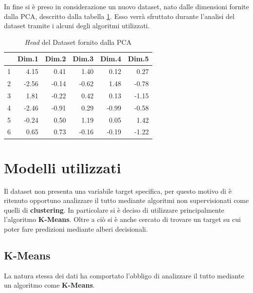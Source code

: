 \documentclass[letterpaper,11pt]{article}
\begin{document}
In fine si è preso in considerazione un nuovo dataset, nato dalle dimensioni fornite dalla PCA, descritto dalla tabella \ref{fig:PCADataset}. Esso verrà sfruttato durante l'analisi del dataset tramite i alcuni degli algoritmi utilizzati.

\begin{table}[h!t] %
\centering
\begin{tabular}{rrrrrr}
  \hline
 & Dim.1 & Dim.2 & Dim.3 & Dim.4 & Dim.5 \\ 
  \hline
1 & 4.15 & 0.41 & 1.40 & 0.12 & 0.27 \\ 
  2 & -2.56 & -0.14 & -0.62 & 1.48 & -0.78 \\ 
  3 & 1.81 & -0.22 & 0.42 & 0.13 & -1.15 \\ 
  4 & -2.46 & -0.91 & 0.29 & -0.99 & -0.58 \\ 
  5 & -0.24 & 0.50 & 1.19 & 0.05 & 1.42 \\ 
  6 & 0.65 & 0.73 & -0.16 & -0.19 & -1.22 \\ 
   \hline
\end{tabular}
\caption{\textit{Head} del Dataset fornito dalla PCA}
\label{fig:PCADataset}
\end{table}



\section{Modelli utilizzati}
Il dataset non presenta una variabile target specifica, per questo motivo di è ritenuto opportuno analizzare il tutto mediante algoritmi non supervisionati come quelli di \textbf{clustering}. In particolare si è deciso di utilizzare principalmente l'algoritmo \textbf{K-Means}. Oltre a ciò si è anche cercato di trovare un target su cui poter fare predizioni mediante alberi decisionali.


\subsection{K-Means}
La natura stessa dei dati ha comportato l'obbligo di analizzare il tutto mediante un algoritmo come \textbf{K-Means}. 
\end{document}
